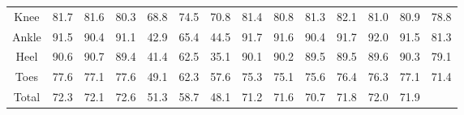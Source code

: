 \documentclass{beamer}
\begin{document}
\begin{frame}
\begin{table}[htbp]
{\begin{adjustbox}{center}
\begin{tabular}{c||ccc|ccc|ccc|ccc|c}
                    Knee & 81.7 & 81.6 & 80.3 & 68.8 & 74.5 & 70.8 & 81.4 & 80.8 & 81.3 & 82.1 & 81.0 & 80.9 & 78.8 \\
                    Ankle & 91.5 & 90.4 & 91.1 & 42.9 & 65.4 & 44.5 & 91.7 & 91.6 & 90.4 & 91.7 & 92.0 & 91.5 & 81.3 \\
                    Heel & 90.6 & 90.7 & 89.4 & 41.4 & 62.5 & 35.1 & 90.1 & 90.2 & 89.5 & 89.5 & 89.6 & 90.3 & 79.1 \\
                    Toes & 77.6 & 77.1 & 77.6 & 49.1 & 62.3 & 57.6 & 75.3 & 75.1 & 75.6 & 76.4 & 76.3 & 77.1 & 71.4 \\
                    \hline
                    Total & 72.3 & 72.1 & 72.6 & 51.3 & 58.7 & 48.1 & 71.2 & 71.6 & 70.7 & 71.8 & 72.0 & 71.9 & \\
                    \hline
                \end{tabular}
            \end{adjustbox}
        }
    \end{table}
\end{frame}
\end{document}
